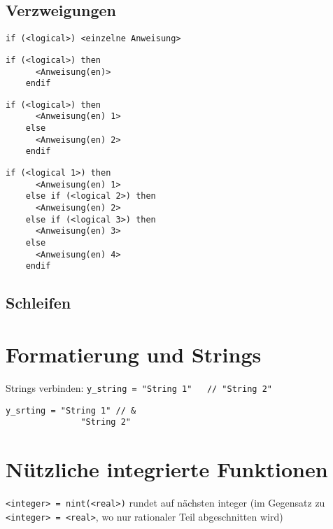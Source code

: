 \documentclass[a4paper,10pt, twocolumn]{scrarticle}
\begin{document}
  \subsection{Verzweigungen}
  \begin{lstlisting}[caption={Einzeilige if-Anweisung}]
    if (<logical>) <einzelne Anweisung>
  \end{lstlisting}
  \begin{lstlisting}[caption={if-then}]
    if (<logical>) then
      <Anweisung(en)>
    endif
  \end{lstlisting}
  \begin{lstlisting}[caption={if-then-else}]
    if (<logical>) then
      <Anweisung(en) 1>
    else
      <Anweisung(en) 2>
    endif
  \end{lstlisting}
  \begin{lstlisting}[caption={if-then-else-if-...-else}]
    if (<logical 1>) then
      <Anweisung(en) 1>
    else if (<logical 2>) then
      <Anweisung(en) 2>
    else if (<logical 3>) then
      <Anweisung(en) 3>
    else
      <Anweisung(en) 4>
    endif
  \end{lstlisting}
  \subsection{Schleifen}
  
  \section{Formatierung und Strings}
  Strings verbinden: \lstinline|y_string = "String 1"   // "String 2"|
  \begin{lstlisting}[caption={String-Verkettung über Code-Zeilen hinweg},label=lst:stringkette]
    y_srting = "String 1" // &
               "String 2"
  \end{lstlisting}
  
  \section{Nützliche integrierte Funktionen}
  \lstinline|<integer> = nint(<real>)| rundet auf nächsten integer (im Gegensatz zu \lstinline|<integer> = <real>|, wo nur rationaler Teil abgeschnitten wird)
  
  
\end{document}
